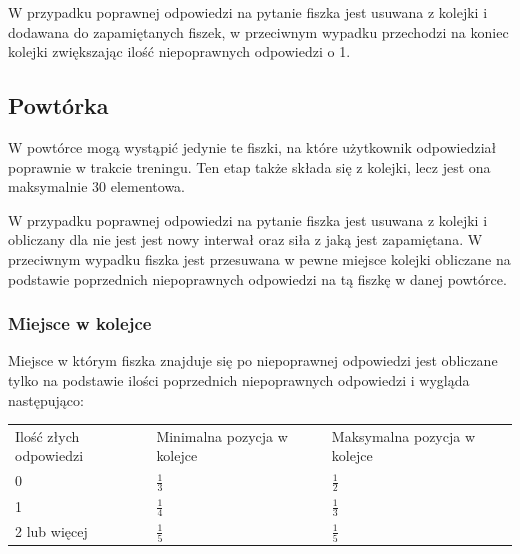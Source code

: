 W przypadku poprawnej odpowiedzi na pytanie fiszka jest usuwana z kolejki i dodawana do zapamiętanych fiszek, w przeciwnym wypadku przechodzi na koniec kolejki zwiększając ilość niepoprawnych odpowiedzi o 1.

\subsection{Powtórka}

W powtórce mogą wystąpić jedynie te fiszki, na które użytkownik odpowiedział poprawnie w trakcie treningu. Ten etap także składa się z kolejki, lecz jest ona maksymalnie 30 elementowa. 

W przypadku poprawnej odpowiedzi na pytanie fiszka jest usuwana z kolejki i obliczany dla nie jest jest nowy interwał oraz siła z jaką jest zapamiętana. W przeciwnym wypadku fiszka jest przesuwana w pewne miejsce kolejki obliczane na podstawie poprzednich niepoprawnych odpowiedzi na tą fiszkę w danej powtórce.

\subsubsection{Miejsce w kolejce}

Miejsce w którym fiszka znajduje się po niepoprawnej odpowiedzi jest obliczane tylko na podstawie ilości poprzednich niepoprawnych odpowiedzi i wygląda następująco:
\begin{minipage}
\begin{center}
\begin{tabular}{| l | l | l |}
\hline
Ilość złych odpowiedzi  & Minimalna pozycja w kolejce & Maksymalna pozycja w kolejce \\ \Xhline{3\arrayrulewidth}

0 & $\frac{1}{3}$ & $\frac{1}{2}$   \\ \hline
1 & $\frac{1}{4}$  & $\frac{1}{3}$   \\ \hline
2 lub więcej & $\frac{1}{5}$   & $\frac{1}{5}$   \\ \hline
\end{tabular}
\label{table:internals}
\end{center}
\end{minipage}

